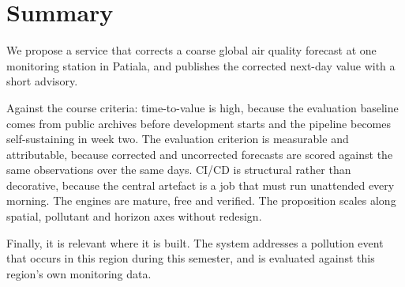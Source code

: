 \documentclass[11pt,a4paper]{article}
\begin{document}
\section{Summary}
We propose a service that corrects a coarse global air
quality forecast at one monitoring station in Patiala,
and publishes the corrected next-day value with a short
advisory.

Against the course criteria: time-to-value is high,
because the evaluation baseline comes from public
archives before development starts and the pipeline
becomes self-sustaining in week two. The evaluation
criterion is measurable and attributable, because
corrected and uncorrected forecasts are scored against
the same observations over the same days. CI/CD is
structural rather than decorative, because the central
artefact is a job that must run unattended every
morning. The engines are mature, free and verified. The
proposition scales along spatial, pollutant and horizon
axes without redesign.

Finally, it is relevant where it is built. The system
addresses a pollution event that occurs in this region
during this semester, and is evaluated against this
region's own monitoring data.
\end{document}
